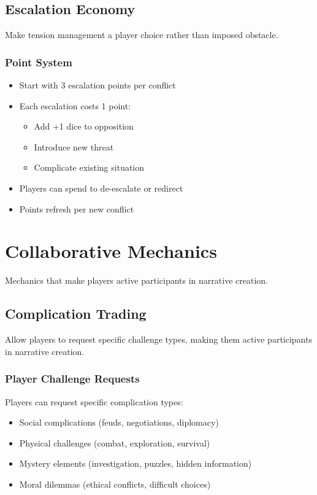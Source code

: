 \begin{description}
\begin{description}
\subsection{Escalation Economy}

Make tension management a player choice rather than imposed obstacle.

\subsubsection{Point System}

\begin{itemize}
\item Start with 3 escalation points per conflict
\item Each escalation costs 1 point:
  \begin{itemize}
  \item Add +1 dice to opposition
  \item Introduce new threat
  \item Complicate existing situation
  \end{itemize}
\item Players can spend to de-escalate or redirect
\item Points refresh per new conflict
\end{itemize}

\section{Collaborative Mechanics}

Mechanics that make players active participants in narrative creation.

\subsection{Complication Trading}

Allow players to request specific challenge types, making them active participants in narrative creation.

\subsubsection{Player Challenge Requests}

Players can request specific complication types:
\begin{itemize}
\item Social complications (feuds, negotiations, diplomacy)
\item Physical challenges (combat, exploration, survival)
\item Mystery elements (investigation, puzzles, hidden information)
\item Moral dilemmas (ethical conflicts, difficult choices)
\end{itemize}


\end{description}
\end{description}
